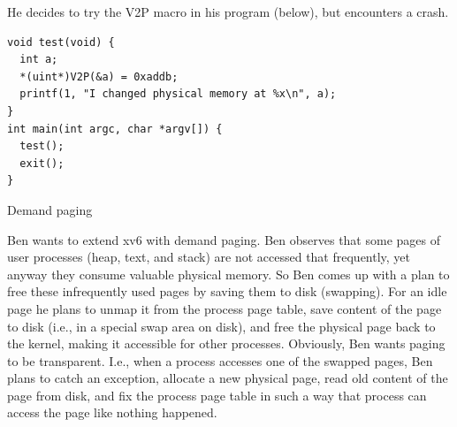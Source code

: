 \documentclass[11pt]{exam}
\begin{document}
\begin{questions}
He decides to try the V2P macro in his program (below), but encounters a crash.
\begin{verbatim}
void test(void) {
  int a;
  *(uint*)V2P(&a) = 0xaddb;
  printf(1, "I changed physical memory at %x\n", a);
}
int main(int argc, char *argv[]) {
  test();
  exit();
}
\end{verbatim}


\newpage
\addpoints
\question Demand paging 

Ben wants to extend xv6 with demand paging. Ben observes that some pages of
user processes (heap, text, and stack) are not accessed
that frequently, yet anyway they consume valuable physical memory. So Ben comes
up with a plan to free these infrequently used pages by saving them to disk (swapping). For an idle page he plans to unmap
it from the process page table, save content of the page to disk (i.e., in a special swap area on disk), and free the physical page back to the 
kernel, making it accessible for other processes. Obviously,
Ben wants paging to be transparent. I.e., when a process accesses one of the
swapped pages, Ben plans to catch an exception, allocate a new physical page,
read old content of the page from disk, and fix the process page table in such a
way that process can access the page like nothing happened. 



\end{questions}
\end{document}
